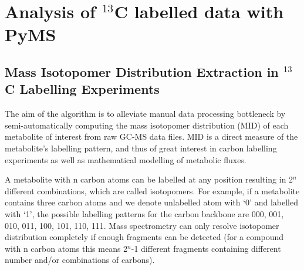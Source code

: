 

\chapter{Analysis of $^{13}$C labelled data with PyMS}


\section
{Mass Isotopomer Distribution Extraction in $^{13}$C Labelling Experiments}


The aim of the algorithm is to alleviate manual data processing bottleneck by 
semi-automatically computing the mass isotopomer distribution (MID) of each 
metabolite of interest from raw GC-MS data files. MID is a direct measure of
the metabolite's labelling pattern, and thus of great interest in carbon
labelling experiments as well as mathematical modelling of metabolic fluxes.

A metabolite with n carbon atoms can be labelled at any position resulting in
2$^{n}$ different combinations, which are called isotopomers. For example, 
if a metabolite contains three carbon atoms and we denote unlabelled atom with
 ‘0’ and labelled with ‘1’, the possible labelling patterns for the carbon 
backbone are 000, 001, 010, 011, 100, 101, 110, 111. Mass spectrometry can only
resolve isotopomer distribution completely if enough fragments can be detected 
(for a compound with n carbon atoms this means 2$^{n}$-1 different fragments 
containing different number and/or combinations of carbons).

